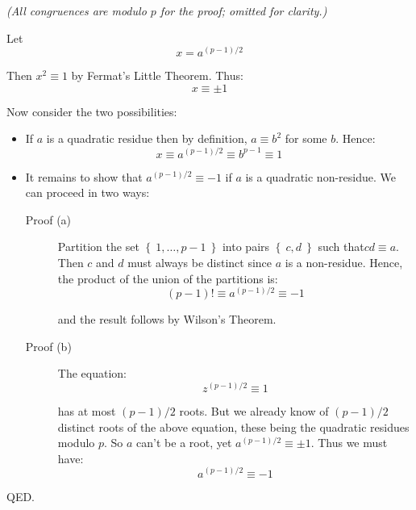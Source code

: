 \documentclass[12pt]{article}
\newcommand{\curbr}[1]{\left\{ #1 \right\}}
\newcommand{\setof}[1]{\curbr{\ #1\ }}
\newcommand{\st}{\textrm{such that}}
\begin{document}
\emph{(All congruences are modulo $p$ for the proof; omitted for clarity.)}

Let
\[ x = a^{(p-1)/2} \]

\noindent Then $x^2 \equiv 1$ by Fermat's Little Theorem. Thus:
\[ x \equiv \pm 1 \]

Now consider the two possibilities:

\begin{itemize}

\item If $a$ is a quadratic residue then by definition, $a \equiv b^2$ for some
$b$. Hence:
\[ x \equiv a^{(p-1)/2} \equiv b^{p-1} \equiv 1 \]

\item It remains to show that $a^{(p-1)/2} \equiv -1$ if $a$ is a quadratic
non-residue. We can proceed in two ways:

\begin{description}

\item[Proof (a)] Partition the set $\setof{1, \ldots, p - 1}$ into
pairs $\setof{c, d}$ \st $c d \equiv a$. Then $c$ and $d$ must
always be distinct since $a$ is a non-residue. Hence, the product of
the union of the partitions is:
\[ (p - 1)! \equiv a^{(p-1)/2} \equiv -1 \]

\noindent and the result follows by Wilson's Theorem.

\item[Proof (b)] The equation:
\[ z^{(p-1)/2} \equiv 1 \]

\noindent has at most $(p-1)/2$ roots. But we already know of $(p-1)/2$
distinct roots of the above equation, these being the quadratic residues modulo
$p$. So $a$ can't be a root, yet $a^{(p-1)/2} \equiv \pm 1$. Thus we must have:
\[ a^{(p-1)/2} \equiv -1 \]

\end{description}

\end{itemize}

\noindent QED.
\end{document}
